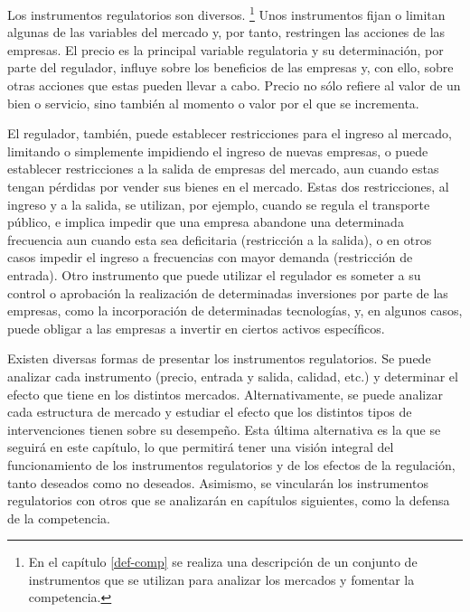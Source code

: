 \documentclass[
  12pt,
  spanish,
]{book}
\begin{document}
Los instrumentos regulatorios son diversos.
\footnote{En el capítulo \ref{def-comp} se realiza una descripción de un conjunto de instrumentos que se utilizan para analizar los mercados y fomentar la competencia.}
Unos instrumentos fijan o limitan algunas de las variables del mercado y, por tanto, restringen las acciones de las empresas. El precio es la principal variable regulatoria y su determinación, por parte del regulador, influye sobre los beneficios de las empresas y, con ello, sobre otras acciones que estas pueden llevar a cabo. Precio no sólo refiere al valor de un bien o servicio, sino también al momento o valor por el que se incrementa.

El regulador, también, puede establecer restricciones para el ingreso al mercado, limitando o simplemente impidiendo el ingreso de nuevas empresas, o puede establecer restricciones a la salida de empresas del mercado, aun cuando estas tengan pérdidas por vender sus bienes en el mercado. Estas dos restricciones, al ingreso y a la salida, se utilizan, por ejemplo, cuando se regula el transporte público, e implica impedir que una empresa abandone una determinada frecuencia aun cuando esta sea deficitaria (restricción a la salida), o en otros casos impedir el ingreso a frecuencias con mayor demanda (restricción de entrada). Otro instrumento que puede utilizar el regulador es someter a su control o aprobación la realización de determinadas inversiones por parte de las empresas, como la incorporación de determinadas tecnologías, y, en algunos casos, puede obligar a las empresas a invertir en ciertos activos específicos.

Existen diversas formas de presentar los instrumentos regulatorios. Se puede analizar cada instrumento (precio, entrada y salida, calidad, etc.) y determinar el efecto que tiene en los distintos mercados. Alternativamente, se puede analizar cada estructura de mercado y estudiar el efecto que los distintos tipos de intervenciones tienen sobre su desempeño. Esta última alternativa es la que se seguirá en este capítulo, lo que permitirá tener una visión integral del funcionamiento de los instrumentos regulatorios y de los efectos de la regulación, tanto deseados como no deseados. Asimismo, se vincularán los instrumentos regulatorios con otros que se analizarán en capítulos siguientes, como la defensa de la competencia.
\end{document}
